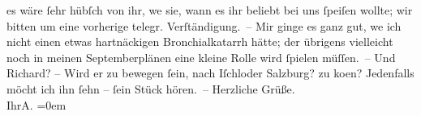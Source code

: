 \begin{ledgroupsized}[t]{13cm}
               es wäre ſehr hübſch von ihr, we{\geminationn}{ }sie, wann es ihr beliebt bei uns ſpeiſen wollte;
               wir bitten um eine vorherige telegr. Verſtändigung. –\pend
           \pstart
           Mir ginge es ganz gut, we{\geminationn} ich nicht einen etwas
               hartnäckigen Bronchialkatarrh hätte; der übrigens vielleicht noch in meinen
                  Septemberplänen eine kleine Rolle wird ſpielen müſſen. –\pend
           \pstart
           {\pb}Und Richard? – Wird
               er zu bewegen ſein, nach Iſchl\introOben{}oder Salzburg?\introOben{} zu ko{\geminationm}en? Jedenfalls möcht ich
               ihn ſehn – ſein Stück
               hören. –\pend
           \pstart
           Herzliche Grüße.{\\[\baselineskip]}Ihr\spacefill\mbox{A.}\pend
           \leftskip=0em{}
         
         \endnumbering{}\end{ledgroupsized}  \newcommand{\dateiname}{L01432}\newcommand{\titel}{Arthur Schnitzler an Hugo von Hofmannsthal, [24. 8. 1904]}\newcommand{\editorInnen}{Martin Anton Müller und Gerd-Hermann Susen}
      